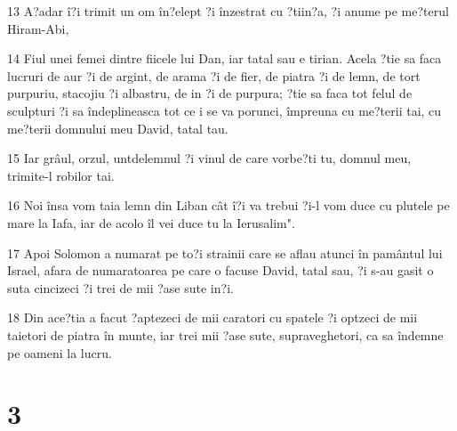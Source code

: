 \par 13 A?adar î?i trimit un om în?elept ?i înzestrat cu ?tiin?a, ?i anume pe me?terul Hiram-Abi,
\par 14 Fiul unei femei dintre fiicele lui Dan, iar tatal sau e tirian. Acela ?tie sa faca lucruri de aur ?i de argint, de arama ?i de fier, de piatra ?i de lemn, de tort purpuriu, stacojiu ?i albastru, de in ?i de purpura; ?tie sa faca tot felul de sculpturi ?i sa îndeplineasca tot ce i se va porunci, împreuna cu me?terii tai, cu me?terii domnului meu David, tatal tau.
\par 15 Iar grâul, orzul, untdelemnul ?i vinul de care vorbe?ti tu, domnul meu, trimite-l robilor tai.
\par 16 Noi însa vom taia lemn din Liban cât î?i va trebui ?i-l vom duce cu plutele pe mare la Iafa, iar de acolo îl vei duce tu la Ierusalim".
\par 17 Apoi Solomon a numarat pe to?i strainii care se aflau atunci în pamântul lui Israel, afara de numaratoarea pe care o facuse David, tatal sau, ?i s-au gasit o suta cincizeci ?i trei de mii ?ase sute in?i.
\par 18 Din ace?tia a facut ?aptezeci de mii caratori cu spatele ?i optzeci de mii taietori de piatra în munte, iar trei mii ?ase sute, supraveghetori, ca sa îndemne pe oameni la lucru.

\chapter{3}

